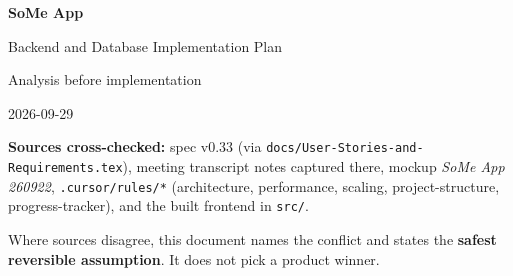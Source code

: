 \documentclass[11pt,a4paper]{article}
\newcommand{\code}[1]{\texttt{\small #1}}
\begin{document}
\begin{titlepage}
\centering
\vspace*{3cm}
{\Huge\bfseries\color{navy} SoMe App\par}
\vspace{0.6cm}
{\LARGE\color{steel} Backend and Database Implementation Plan\par}
\vspace{1cm}
{\large Analysis before implementation\par}
\vspace{0.4cm}
{\normalsize 2026-09-29\par}
\vfill
\begin{minipage}{0.85\textwidth}
\small
\textbf{Sources cross-checked:} spec v0.33 (via \code{docs/User-Stories-and-Requirements.tex}), meeting
transcript notes captured there, mockup \emph{SoMe App 260922}, \code{.cursor/rules/*} (architecture,
performance, scaling, project-structure, progress-tracker), and the built frontend in \code{src/}.

Where sources disagree, this document names the conflict and states the \textbf{safest reversible
assumption}. It does not pick a product winner.
\end{minipage}
\end{titlepage}

\tableofcontents
\newpage

\end{document}
